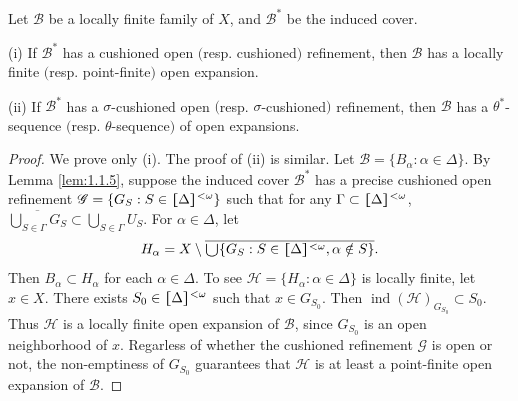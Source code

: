 \documentclass[prelim.tex]{subfiles}
\begin{document}
{\lemma{} \label{lem:1.2.3}
Let $\mathscr{B}$ be a locally finite family of $X$, 
and $\mathscr{B}^*$ be the induced cover.%

\textup{(i)} If $\mathscr{B}^*$ has a cushioned open $($resp. cushioned$)$ refinement, then $\mathscr{B}$ has a locally finite $($resp. point-finite$)$ open expansion.

\textup{(ii)}  If $\mathscr{B}^*$ has a $\sigma$-cushioned open $($resp. $\sigma$-cushioned$)$ refinement, then $\mathscr{B}$ has a $\theta^*$-sequence $($resp. $\theta$-sequence$)$ 
of open expansions.
} %

\begin{proof} 
We prove only (i). The proof of (ii) is
similar. Let $\mathscr{B} = \{B_\alpha: \alpha \in \Delta\}$. By Lemma \ref{lem:1.1.5}, suppose
the induced cover $\mathscr{B}^*$ %
has a precise cushioned open refinement
$\mathscr{G} = \{G_S: S\in \hstretch{1.8}{[}\Delta\hstretch{1.8}{]}^{<\omega}\}$ such that for any
$\Gamma\subset\hstretch{1.8}{[}\Delta\hstretch{1.8}{]}^{<\omega}$,
$\overline{\bigcup_{S\in\Gamma}G_S}\subset\bigcup_{S\in\Gamma}U_S$.
For $\alpha\in\Delta$, let
$$H_\alpha = X \setminus \overline{ \raisebox{-2pt}{\scalebox{1.5}{$\cup$}}\{G_S: 
	S\in \hstretch{1.8}{[}\Delta\hstretch{1.8}{]}^{<\omega}, \alpha\notin S\}}.$$
Then $B_\alpha\subset H_\alpha$ for each $\alpha\in\Delta$.
To see $\mathscr{H}=\{H_\alpha: \alpha\in\Delta\}$
is locally finite, let $x \in X$. There exists $S_0 \in \hstretch{1.8}{[}\Delta\hstretch{1.8}{]}^{<\omega}$ such that 
$x \in G_{S_0}$.
Then $\operatorname{ind}(\mathscr{H})_{G_{S_0}}  \subset S_0$. Thus 
$\mathscr{H}$ is a locally finite open expansion
of $\mathscr{B}$, since $G_{S_0}$ is an open neighborhood of $x$. Regarless of whether the cushioned refinement  $\mathscr{G}$ is  open or not, 
the non-emptiness of $G_{S_0}$ guarantees that  $\mathscr{H}$ is 
at least a point-finite open expansion of $\mathscr{B}$.
\end{proof} 
\end{document}
